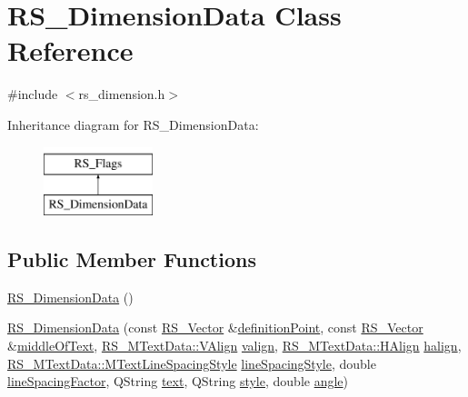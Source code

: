 \hypertarget{classRS__DimensionData}{\section{R\-S\-\_\-\-Dimension\-Data Class Reference}
\label{classRS__DimensionData}
}


{\ttfamily \#include $<$rs\-\_\-dimension.\-h$>$}

Inheritance diagram for R\-S\-\_\-\-Dimension\-Data\-:\begin{figure}[H]
\begin{center}
\leavevmode
\includegraphics[height=2.000000cm]{classRS__DimensionData}
\end{center}
\end{figure}
\subsection*{Public Member Functions}
\begin{DoxyCompactItemize}
\item 
\hyperlink{classRS__DimensionData_ad8bf79d99ae7922e64f4fce55ceaa61c}{R\-S\-\_\-\-Dimension\-Data} ()
\item 
\hyperlink{classRS__DimensionData_a81f962c8b254062f950ea9270f90bbd8}{R\-S\-\_\-\-Dimension\-Data} (const \hyperlink{classRS__Vector}{R\-S\-\_\-\-Vector} \&\hyperlink{classRS__DimensionData_aaa0d4876e7fe6d387b614ce5061fd41b}{definition\-Point}, const \hyperlink{classRS__Vector}{R\-S\-\_\-\-Vector} \&\hyperlink{classRS__DimensionData_a554e15e3d0387bf5d4b396b6fa2a55c0}{middle\-Of\-Text}, \hyperlink{classRS__MTextData_a9f1c092c22fc207e48e1f3f23b93d54f}{R\-S\-\_\-\-M\-Text\-Data\-::\-V\-Align} \hyperlink{classRS__DimensionData_a64f784647be6abf5e47fa6b20a8072dc}{valign}, \hyperlink{classRS__MTextData_ad819fe18c56a345fcfb205705c0445cc}{R\-S\-\_\-\-M\-Text\-Data\-::\-H\-Align} \hyperlink{classRS__DimensionData_a4dc9c4badabffec10a80cc6e145bbc4b}{halign}, \hyperlink{classRS__MTextData_ada9028cb480af4b0365164c6edd4a3ad}{R\-S\-\_\-\-M\-Text\-Data\-::\-M\-Text\-Line\-Spacing\-Style} \hyperlink{classRS__DimensionData_a259f4f13e239b33fecd8adcc59476d78}{line\-Spacing\-Style}, double \hyperlink{classRS__DimensionData_a68af239c4f73570483766d6b8f81ba53}{line\-Spacing\-Factor}, Q\-String \hyperlink{classRS__DimensionData_ae7806851498b4d88728e0d01b22a3d64}{text}, Q\-String \hyperlink{classRS__DimensionData_a8ba6161a65fdd25cd383baad9416ebc4}{style}, double \hyperlink{classRS__DimensionData_a7ef296ececae34dcbb9285010327d55f}{angle})
\end{DoxyCompactItemize}
